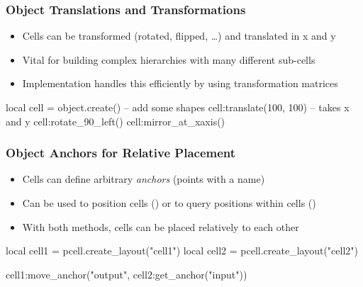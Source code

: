 \documentclass[aspectratio=169, dvipsnames, x11names, svgnames, 11pt]{beamer}
\begin{document}
\begin{frame}[fragile]
    \frametitle{Object Translations and Transformations}
    \begin{itemize}
        \item Cells can be transformed (rotated, flipped, \dots) and translated in x and y
        \item Vital for building complex hierarchies with many different sub-cells
        \item Implementation handles this efficiently by using transformation matrices
    \end{itemize}
    \vfill
    \begin{luacode}
        local cell = object.create()
        -- add some shapes
        cell:translate(100, 100) -- takes x and y
        cell:rotate_90_left()
        cell:mirror_at_xaxis()
    \end{luacode}
\end{frame}

\begin{frame}[fragile]
    \frametitle{Object Anchors for Relative Placement}
    \begin{itemize}
        \item Cells can define arbitrary \emph{anchors} (points with a name)
        \item Can be used to position cells () or to query positions within cells ()
        \item With both methods, cells can be placed relatively to each other
    \end{itemize}
    \vfill
    \begin{luacode}
        local cell1 = pcell.create_layout("cell1")
        local cell2 = pcell.create_layout("cell2")

        cell1:move_anchor("output", cell2:get_anchor("input"))
    \end{luacode}
\end{frame}
\end{document}
